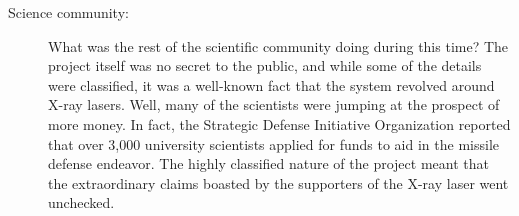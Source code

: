 \documentclass[12pt]{article}
\begin{document}
\begin{description}
\begin{description}
      \item[Science community:] What was the rest of the scientific community
        doing during this time? The project itself was no secret to the public,
        and while some of the details were classified, it was a well-known fact
        that the system revolved around X-ray lasers. Well, many of the
        scientists were jumping at the prospect of more money. In fact, the
        Strategic Defense Initiative Organization reported that over 3,000
        university scientists applied for funds to aid in the missile defense
        endeavor. The highly classified nature of the project meant that the
        extraordinary claims boasted by the supporters of the X-ray laser went
        unchecked.

    \end{description}

\end{description}
\end{document}
